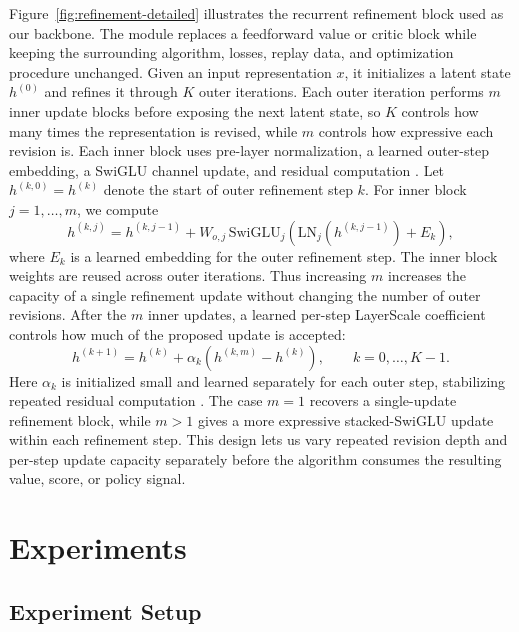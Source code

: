 \documentclass{article}
\begin{document}
Figure~\ref{fig:refinement-detailed} illustrates the recurrent refinement block used as our backbone. The module replaces a feedforward value or critic block while keeping the surrounding algorithm, losses, replay data, and optimization procedure unchanged. Given an input representation $x$, it initializes a latent state $h^{(0)}$ and refines it through $K$ outer iterations. Each outer iteration performs $m$ inner update blocks before exposing the next latent state, so $K$ controls how many times the representation is revised, while $m$ controls how expressive each revision is. Each inner block uses pre-layer normalization, a learned outer-step embedding, a SwiGLU channel update, and residual computation \citep{layer_norm, universal_transformer, shazeer_glu}. Let $h^{(k,0)}=h^{(k)}$ denote the start of outer refinement step $k$. For inner block $j=1,\ldots,m$, we compute
\begin{equation}
h^{(k,j)}
=
h^{(k,j-1)}
+
W_{o,j}\,\mathrm{SwiGLU}_{j}
\!\left(\mathrm{LN}_{j}(h^{(k,j-1)}) + E_k\right),
\end{equation}
where $E_k$ is a learned embedding for the outer refinement step. The inner block weights are reused across outer iterations. Thus increasing $m$ increases the capacity of a single refinement update without changing the number of outer revisions. After the $m$ inner updates, a learned per-step LayerScale coefficient controls how much of the proposed update is accepted:
\begin{equation}
h^{(k+1)}
=
h^{(k)}
+\alpha_k\left(h^{(k,m)}-h^{(k)}\right),
\qquad k=0,\ldots,K-1.
\end{equation}
Here $\alpha_k$ is initialized small and learned separately for each outer step, stabilizing repeated residual computation \citep{layerscale}. The case $m=1$ recovers a single-update refinement block, while $m>1$ gives a more expressive stacked-SwiGLU update within each refinement step. This design lets us vary repeated revision depth and per-step update capacity separately before the algorithm consumes the resulting value, score, or policy signal.


\section{Experiments}
\subsection{Experiment Setup}\label{section:exp-setup}
\end{document}

